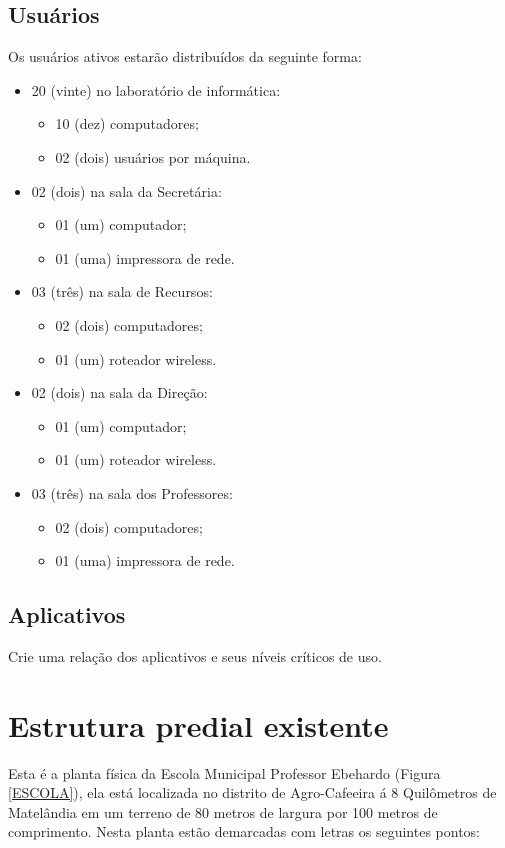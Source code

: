\documentclass[	DIV=calc,%
							paper=a4,%
							fontsize=12pt,%
							onecolumn]{scrartcl}	 					%
\begin{document}
\subsection{Usuários}
Os usuários ativos estarão distribuídos da seguinte forma:
\begin{itemize}
	\item 20 (vinte) no laboratório de informática:
		\begin{itemize}
			\item 10 (dez) computadores;
			\item 02 (dois) usuários por máquina.
		\end{itemize}
	\item 02 (dois) na sala da Secretária:
	   \begin{itemize}
	   	\item 01 (um) computador; 
	   	\item 01 (uma) impressora de rede.
	   \end{itemize} 
	\item 03 (três) na sala de Recursos:
		\begin{itemize}
			\item 02 (dois) computadores;
			\item 01 (um) roteador wireless.
		\end{itemize}
	\item 02 (dois) na sala da Direção:
		\begin{itemize}
			\item 01 (um) computador;
			\item 01 (um) roteador wireless.
		\end{itemize}
	\item 03 (três) na sala dos Professores:
		\begin{itemize}
			\item 02 (dois) computadores;
			\item 01 (uma) impressora de rede.
		\end{itemize}
\end{itemize}
\subsection{Aplicativos}
Crie uma relação dos aplicativos e seus níveis críticos de uso.

\section{Estrutura predial existente}
Esta é a planta física da Escola Municipal Professor Ebehardo (Figura \ref{ESCOLA}), ela está localizada no distrito de Agro-Cafeeira á 8 Quilômetros de Matelândia em um terreno de 80 metros de largura por 100 metros de comprimento.
Nesta planta estão demarcadas com letras os seguintes pontos:
\end{document}
